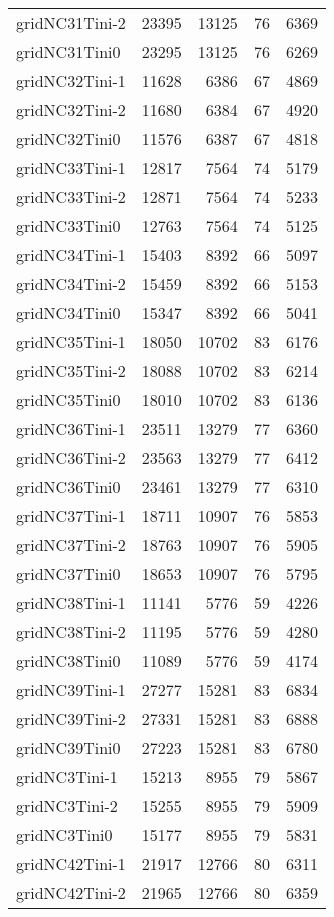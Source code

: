 \begin{longtable}{lrrrr}
gridNC31Tini-2 & 23395 & 13125 & 76 & 6369 \\
gridNC31Tini0 & 23295 & 13125 & 76 & 6269 \\
gridNC32Tini-1 & 11628 & 6386 & 67 & 4869 \\
gridNC32Tini-2 & 11680 & 6384 & 67 & 4920 \\
gridNC32Tini0 & 11576 & 6387 & 67 & 4818 \\
gridNC33Tini-1 & 12817 & 7564 & 74 & 5179 \\
gridNC33Tini-2 & 12871 & 7564 & 74 & 5233 \\
gridNC33Tini0 & 12763 & 7564 & 74 & 5125 \\
gridNC34Tini-1 & 15403 & 8392 & 66 & 5097 \\
gridNC34Tini-2 & 15459 & 8392 & 66 & 5153 \\
gridNC34Tini0 & 15347 & 8392 & 66 & 5041 \\
gridNC35Tini-1 & 18050 & 10702 & 83 & 6176 \\
gridNC35Tini-2 & 18088 & 10702 & 83 & 6214 \\
gridNC35Tini0 & 18010 & 10702 & 83 & 6136 \\
gridNC36Tini-1 & 23511 & 13279 & 77 & 6360 \\
gridNC36Tini-2 & 23563 & 13279 & 77 & 6412 \\
gridNC36Tini0 & 23461 & 13279 & 77 & 6310 \\
gridNC37Tini-1 & 18711 & 10907 & 76 & 5853 \\
gridNC37Tini-2 & 18763 & 10907 & 76 & 5905 \\
gridNC37Tini0 & 18653 & 10907 & 76 & 5795 \\
gridNC38Tini-1 & 11141 & 5776 & 59 & 4226 \\
gridNC38Tini-2 & 11195 & 5776 & 59 & 4280 \\
gridNC38Tini0 & 11089 & 5776 & 59 & 4174 \\
gridNC39Tini-1 & 27277 & 15281 & 83 & 6834 \\
gridNC39Tini-2 & 27331 & 15281 & 83 & 6888 \\
gridNC39Tini0 & 27223 & 15281 & 83 & 6780 \\
gridNC3Tini-1 & 15213 & 8955 & 79 & 5867 \\
gridNC3Tini-2 & 15255 & 8955 & 79 & 5909 \\
gridNC3Tini0 & 15177 & 8955 & 79 & 5831 \\
gridNC42Tini-1 & 21917 & 12766 & 80 & 6311 \\
gridNC42Tini-2 & 21965 & 12766 & 80 & 6359 \\

\end{longtable}
